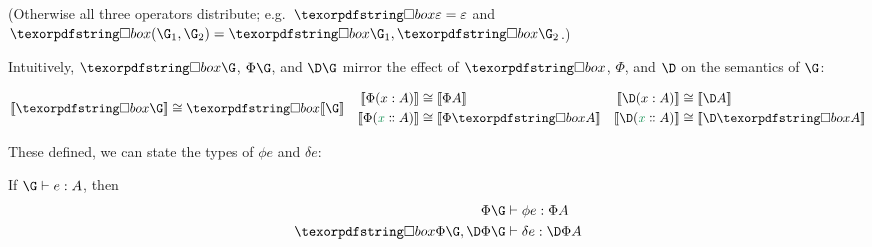 
\noindent
(Otherwise all three operators distribute; e.g.\ $\iso\emptycx = \emptycx$ and
$\iso(\G_1,\G_2) = \iso\G_1, \iso\G_2$.)

Intuitively, $\iso\G$, $\Phi\G$, and $\D\G$ mirror the effect of
$\iso$, $\Phi$, and $\D$ on the semantics of $\G$:

\begin{align*}
  \den{\iso\G} &\cong \iso\den\G
  &
  \begin{aligned}
    \den{\Phi(\h x A)} &\cong \den{\Phi A}
    \\
    \den{\Phi(\hd x A)} &\cong \den{\Phi \iso A}
  \end{aligned}
  &&
  \begin{aligned}
    \den{\D(\h x A)} &\cong \den{\D A}
    \\
    \den{\D(\hd x A)} &\cong \den{\D \iso A}
  \end{aligned}
\end{align*}


\noindent
These defined, we can state the types of $\phi e$ and $\delta e$:

\begin{theorem}
  \label{thm:type-correct}
  If $\J e \G A$, then
  \begin{align*}
    \Jalign {\phi e} {\Phi\G} {\Phi A}\\
    \Jalign {\delta e} {\iso{\Phi\G}, \DP\G} {\DP A}
  \end{align*}
\end{theorem}

